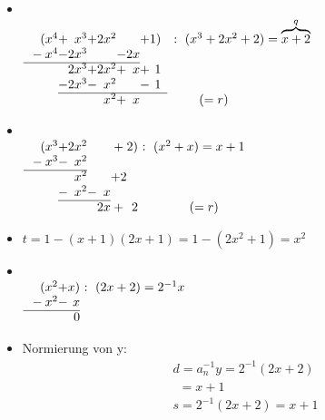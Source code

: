 \documentclass[12pt,titlepage, pdf]{article}
\renewcommand{\>}{\rightarrow}
\renewcommand{\*}{\cdot}
\begin{document}
		      	\begin{itemize}
		      		\item ~\\
		      		      $\begin{array}{r@{}c@{}r@{}c@{}r@{}c@{}r@{}c@{}rl}
		      		      	(x^4 & + & x^3 & + & 2x^2 &   &   & + & 1) & :  ~ (x^3+2x^2+2) = \overbrace{x+2}^{q} \\
		      		      	{}-x^4 &- & 2x^3 &  & &-&2x \\ \cline{1-7} 
		      		      	&  & 2x^3 & + & 2x^2 & + & x&+&1 \\
		      		      	&- &2x^3 & - & x^2 &  & &-&1 \\ \cline{2-9}
		      		      	     &   &     &   & x^2  & + & x &   &    & \qquad (=r)                             
		      		      \end{array}$
		      		\item ~\\
		      		      $\begin{array}{r@{}c@{}r@{}c@{}r@{}c@{}r@{}c@{}rl}
		      		      	(x^3 & + & 2x^2 &   &    & + & 2) & ~ :  ~ (x^2+x) =x+1 \\
		      		      	{}-x^3&-&x^2\\ \cline{1-3}
		      		      	&&x^2&&&+2\\
		      		      	&-&x^2&-&x\\\cline{2-5}
		      		      	     &   &      &   & 2x & + & 2  & \qquad (=r)         
		      		      \end{array}$
		      		\item $ t = 1-(x+1)(2x+1) = 1-(2x^2 + 1) = x^2$ \\
		      		\item ~\\
		      		      $\begin{array}{r@{}c@{}r@{}c@{}r@{}c@{}r@{}c@{}rl}
		      		      	(x^2 & + & x) & ~ :  ~ (2x+2) =2^{-1}x \\
		      		      	{}-x^2&-&x\\ \cline{1-3}
		      		      	&&0
		      		      \end{array}$
		      		\item Normierung von y: \\
		      		      \begin{align*}
		      		      	  & d = a_n^{-1} y = 2^{-1}(2x +2)                     \\&~~= x +1 \\
		      		      	  & s = 2^{-1}(2x +2) = x+1                            \\

\end{align*}
\end{itemize}
\end{document}
